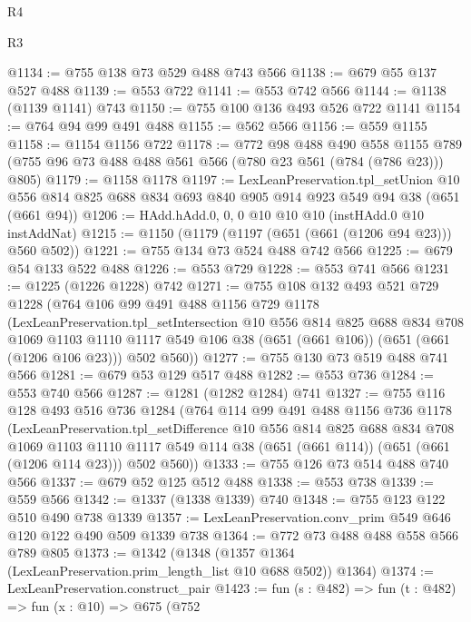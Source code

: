 \begin{lexlean}{R4}
\begin{lexlean}{R3}
\begin{coremodule}
{{{{{{{{{{{{{{{{@1134 := @755 @138 @73 @529 @488 @743 @566
@1138 := @679 @55 @137 @527 @488
@1139 := @553 @722
@1141 := @553 @742 @566
@1144 := @1138 (@1139 @1141) @743
@1150 := @755 @100 @136 @493 @526 @722 @1141
@1154 := @764 @94 @99 @491 @488
@1155 := @562 @566
@1156 := @559 @1155
@1158 := @1154 @1156 @722
@1178 := @772
    @98
    @488
    @490
    @558
    @1155
    @789
    (@755 @96 @73 @488 @488 @561 @566 (@780 @23 @561 (@784 (@786 @23))) @805)
@1179 := @1158 @1178
@1197 := LexLeanPreservation.tpl_setUnion
    @10
    @556
    @814
    @825
    @688
    @834
    @693
    @840
    @905
    @914
    @923
    @549
    @94
    @38
    (@651 (@661 @94))
@1206 := HAdd.hAdd.{0, 0, 0} @10 @10 @10 (instHAdd.{0} @10 instAddNat)
@1215 := @1150 (@1179 (@1197 (@651 (@661 (@1206 @94 @23))) @560 @502))
@1221 := @755 @134 @73 @524 @488 @742 @566
@1225 := @679 @54 @133 @522 @488
@1226 := @553 @729
@1228 := @553 @741 @566
@1231 := @1225 (@1226 @1228) @742
@1271 := @755
    @108
    @132
    @493
    @521
    @729
    @1228
    (@764
      @106
      @99
      @491
      @488
      @1156
      @729
      @1178
      (LexLeanPreservation.tpl_setIntersection
        @10
        @556
        @814
        @825
        @688
        @834
        @708
        @1069
        @1103
        @1110
        @1117
        @549
        @106
        @38
        (@651 (@661 @106))
        (@651 (@661 (@1206 @106 @23)))
        @502
        @560))
@1277 := @755 @130 @73 @519 @488 @741 @566
@1281 := @679 @53 @129 @517 @488
@1282 := @553 @736
@1284 := @553 @740 @566
@1287 := @1281 (@1282 @1284) @741
@1327 := @755
    @116
    @128
    @493
    @516
    @736
    @1284
    (@764
      @114
      @99
      @491
      @488
      @1156
      @736
      @1178
      (LexLeanPreservation.tpl_setDifference
        @10
        @556
        @814
        @825
        @688
        @834
        @708
        @1069
        @1103
        @1110
        @1117
        @549
        @114
        @38
        (@651 (@661 @114))
        (@651 (@661 (@1206 @114 @23)))
        @502
        @560))
@1333 := @755 @126 @73 @514 @488 @740 @566
@1337 := @679 @52 @125 @512 @488
@1338 := @553 @738
@1339 := @559 @566
@1342 := @1337 (@1338 @1339) @740
@1348 := @755 @123 @122 @510 @490 @738 @1339
@1357 := LexLeanPreservation.conv_prim @549 @646 @120 @122 @490 @509 @1339 @738
@1364 := @772 @73 @488 @488 @558 @566 @789 @805
@1373 := @1342 (@1348 (@1357 @1364 (LexLeanPreservation.prim_length_list @10 @688 @502)) @1364)
@1374 := LexLeanPreservation.construct_pair
@1423 := fun (s : @482) =>
  fun (t : @482) =>
  fun (x : @10) =>
  @675
    (@752
}}}}}}}}}}}}}}}}
\end{coremodule}
\end{lexlean}
\end{lexlean}

